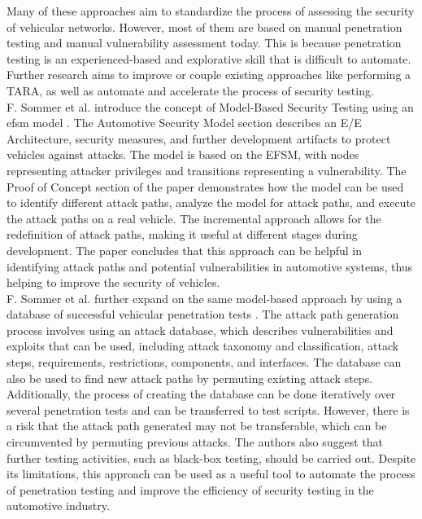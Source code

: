 Many of these approaches aim to standardize the process of assessing the security of vehicular networks. However, most of them are based on manual penetration testing and manual vulnerability assessment today. 
This is because penetration testing is an experienced-based and explorative skill that is difficult to automate. 
Further research aims to improve or couple existing approaches like performing a TARA, as well as automate and accelerate the process of security testing.\\

F. Sommer et al. introduce the concept of Model-Based Security Testing using an \gls{efsm} model \cite{model_based_testing}.
The Automotive Security Model section describes an E/E Architecture, security measures, and further development artifacts to protect vehicles against attacks.
The model is based on the EFSM, with nodes representing attacker privileges and transitions representing a vulnerability.
The Proof of Concept section of the paper demonstrates how the model can be used to identify different attack paths, analyze the model for attack paths, and execute the attack paths on a real vehicle. 
The incremental approach allows for the redefinition of attack paths, making it useful at different stages during development. 
The paper concludes that this approach can be helpful in identifying attack paths and potential vulnerabilities in automotive systems, thus helping to improve the security of vehicles.\\

F. Sommer et al. further expand on the same model-based approach by using a database of successful vehicular penetration tests \cite{attack_database}.
The attack path generation process involves using an attack database, which describes vulnerabilities and exploits that can be used, including attack taxonomy and classification, attack steps, requirements, restrictions, components, and interfaces. 
The database can also be used to find new attack paths by permuting existing attack steps. 
Additionally, the process of creating the database can be done iteratively over several penetration tests and can be transferred to test scripts. 
However, there is a risk that the attack path generated may not be transferable, which can be circumvented by permuting previous attacks. 
The authors also suggest that further testing activities, such as black-box testing, should be carried out. 
Despite its limitations, this approach can be used as a useful tool to automate the process of penetration testing and improve the efficiency of security testing in the automotive industry.\\

